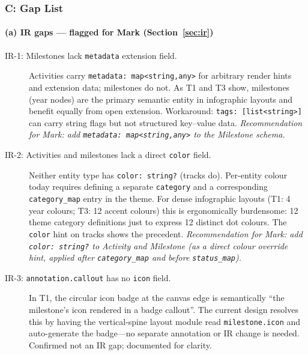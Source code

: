 \subsubsection{C: Gap List}
\label{sec:target-gap-list}

\paragraph{(a) IR gaps --- flagged for Mark (Section~\ref{sec:ir})}
\label{sec:target-gaps-ir}

\begin{description}
  \item[IR-1: Milestones lack \texttt{metadata} extension field.]
        Activities carry \texttt{metadata: map<string,any>} for arbitrary render hints
        and extension data; milestones do not. As T1 and T3 show, milestones (year nodes)
        are the primary semantic entity in infographic layouts and benefit equally from
        open extension. Workaround: \texttt{tags: [list<string>]} can carry string flags
        but not structured key--value data.
        \emph{Recommendation for Mark: add \texttt{metadata: map<string,any>} to the
        Milestone schema.}

  \item[IR-2: Activities and milestones lack a direct \texttt{color} field.]
        Neither entity type has \texttt{color: string?} (tracks do). Per-entity colour
        today requires defining a separate \texttt{category} and a corresponding
        \texttt{category\_map} entry in the theme. For dense infographic layouts (T1: 4
        year colours; T3: 12 accent colours) this is ergonomically burdensome: 12 theme
        category definitions just to express 12 distinct dot colours. The \texttt{color}
        hint on tracks shows the precedent.
        \emph{Recommendation for Mark: add \texttt{color: string?} to Activity and
        Milestone (as a direct colour override hint, applied after \texttt{category\_map}
        and before \texttt{status\_map}).}

  \item[IR-3: \texttt{annotation.callout} has no \texttt{icon} field.]
        In T1, the circular icon badge at the canvas edge is semantically ``the
        milestone's icon rendered in a badge callout''. The current design resolves this
        by having the vertical-spine layout module read \texttt{milestone.icon} and
        auto-generate the badge---no separate annotation or IR change is needed. Confirmed
        not an IR gap; documented for clarity.


\end{description}
